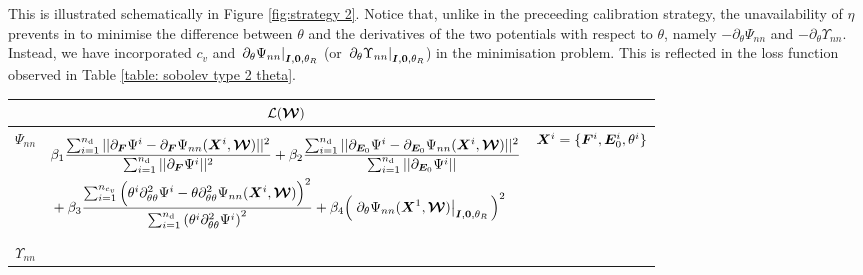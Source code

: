 This is illustrated schematically in Figure \ref{fig:strategy 2}. Notice that, unlike in the preceeding calibration strategy, the unavailability of $\eta$ prevents in to minimise the difference between $\theta$ and the derivatives of the two potentials with respect to $\theta$, namely $-\partial_{\theta}\Psi_{nn}$ and $-\partial_{\theta}\Upsilon_{nn}$. Instead, we have incorporated $c_v$ and $\left.\partial_{\theta}\Psi_{nn}\right\vert_{\boldsymbol{I},\boldsymbol{0},\theta_R}$
(or $\left.\partial_{\theta}\Upsilon_{nn}\right\vert_{\boldsymbol{I},\boldsymbol{0},\theta_R}$) in the minimisation problem. This is reflected in the loss function observed in Table \ref{table: sobolev type 2 theta}.

\begin{table}[htbp!]
	\centering
	\begin{tabular}{c c c}
		\toprule
		\rowcolor{gray!30}	\small{} & $\mathcal{L}(\boldsymbol{\mathcal{W}})$ &\\
		\midrule
		$\Psi_{nn}$	&	\begin{minipage}{0.75\textwidth}
			\begin{equation*}
			\begin{aligned}
			& \beta_1\frac{\sum_{i=1}^{n_{\text{d}}} \vert\vert \partial_{\boldsymbol{F}}\Psi^{i} - \partial_{\boldsymbol{F}} \Psi_{nn}(\boldsymbol{X}^i, \boldsymbol{\mathcal{W}}) \vert\vert^2}{\sum_{i=1}^{n_{\text{d}}} \vert\vert \partial_{\boldsymbol{F}}\Psi^{i} \vert\vert^2}  + \beta_2\frac{\sum_{i=1}^{n_{\text{d}}} \vert\vert \partial_{\boldsymbol{E}_0}\Psi^{i} - \partial_{\boldsymbol{E}_0} \Psi_{nn}(\boldsymbol{X}^i, \boldsymbol{\mathcal{W}}) \vert\vert^2}{\sum_{i=1}^{n_{\text{d}}} \vert\vert \partial_{\boldsymbol{E}_0}\Psi^{i} \vert\vert} \\
			& + \beta_3\frac{\sum_{i=1}^{n_{c_v}} \Big(\theta^i\partial^2_{\theta\theta}\Psi^i- \theta\partial^2_{\theta\theta}\Psi_{nn}(\boldsymbol{X}^i, \boldsymbol{\mathcal{W}}) \Big)^2}{\sum_{i=1}^{n_{\text{d}}}   \left(\theta^i\partial^2_{\theta\theta}\Psi^i\right)^2} + \beta_4\Big(\left. \partial_{\theta}\Psi_{nn}(\boldsymbol{X}^1,\boldsymbol{\mathcal{W}})\right\vert_{\boldsymbol{I},\boldsymbol{0},\theta_R}\Big)^2
			\end{aligned}
			\end{equation*}
		\end{minipage}  & $\boldsymbol{X}^i=\{\boldsymbol{F}^i, \boldsymbol{E}_0^i, \theta^i\}$ \\
%
\midrule
		$\Upsilon_{nn}$ &		\begin{minipage}{0.75\textwidth}
			\begin{equation*}
			\begin{aligned}

\end{aligned}
\end{equation*}
\end{minipage}
\end{tabular}
\end{table}
